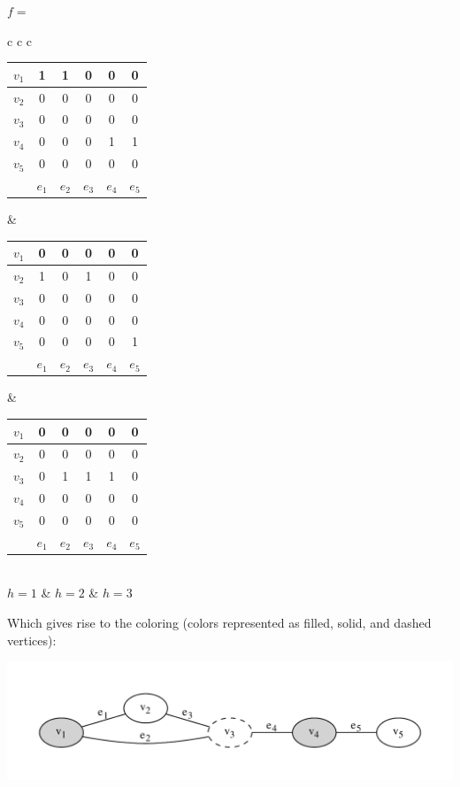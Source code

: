 \documentclass[]{article}
\theoremstyle{definition}
\theoremstyle{remark}
\numberwithin{equation}{section}
\begin{document}
\begin{center}
	$f=$
	\begin{tabular}{ c c c }
		\begin{tabular}{r | c | c | c | c | c}
			$v_1$ & 1 & 1 & 0 & 0 & 0 \\ \hline
			$v_2$ & 0 & 0 & 0 & 0 & 0 \\ \hline
			$v_3$ & 0 & 0 & 0 & 0 & 0 \\ \hline
			$v_4$ & 0 & 0 & 0 & 1 & 1 \\ \hline
			$v_5$ & 0 & 0 & 0 & 0 & 0 \\ \hline
			& $e_1$ & $e_2$ & $e_3$ & $e_4$ & $e_5$
		\end{tabular} & 
		\begin{tabular}{r | c | c | c | c | c}
			$v_1$ & 0 & 0 & 0 & 0 & 0 \\ \hline
			$v_2$ & 1 & 0 & 1 & 0 & 0 \\ \hline
			$v_3$ & 0 & 0 & 0 & 0 & 0 \\ \hline
			$v_4$ & 0 & 0 & 0 & 0 & 0 \\ \hline
			$v_5$ & 0 & 0 & 0 & 0 & 1 \\ \hline
			& $e_1$ & $e_2$ & $e_3$ & $e_4$ & $e_5$
		\end{tabular} & 
		\begin{tabular}{r | c | c | c | c | c}
			$v_1$ & 0 & 0 & 0 & 0 & 0 \\ \hline
			$v_2$ & 0 & 0 & 0 & 0 & 0 \\ \hline
			$v_3$ & 0 & 1 & 1 & 1 & 0 \\ \hline
			$v_4$ & 0 & 0 & 0 & 0 & 0 \\ \hline
			$v_5$ & 0 & 0 & 0 & 0 & 0 \\ \hline
			& $e_1$ & $e_2$ & $e_3$ & $e_4$ & $e_5$
		\end{tabular} \\
		$h=1$ & $h=2$ & $h=3$
	\end{tabular}
\end{center}
Which gives rise to the coloring (colors represented as filled, solid, and dashed vertices):
\begin{center}
	\includegraphics[scale=0.75]{3colorinstancecolored}
\end{center}
\end{document}
